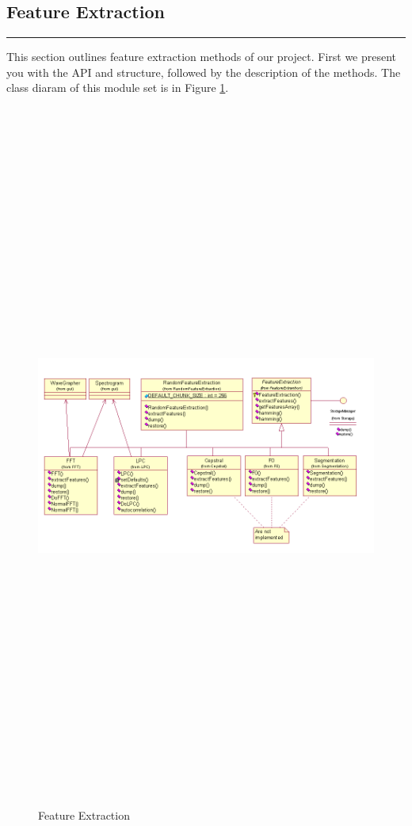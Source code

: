 \subsection{Feature Extraction}
\noindent
\rule{7.0in}{.013in}

This section outlines feature extraction methods of our project.
First we present you with the API and structure, followed
by the description of the methods. The class diaram of this
module set is in Figure \ref{fig:feat}.

\begin{figure}
	\centering
	\includegraphics[angle=90,height=660pt]{../graphics/arch/feature-extraction.png}
	\caption{Feature Extraction}
	\label{fig:feat}
\end{figure}







%


